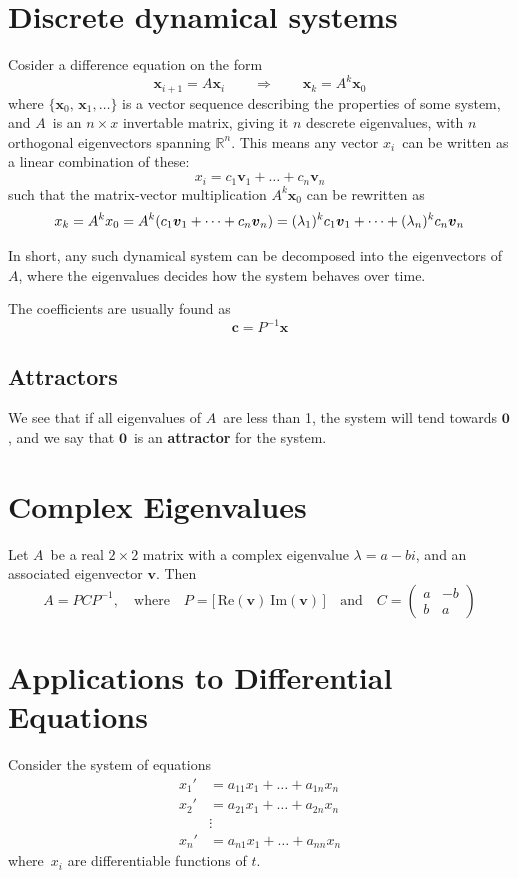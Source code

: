 \documentclass[12p,a4paper]{report}
\renewcommand{\b}{\boldsymbol}
\newcommand{\m}{\mathbb}
\begin{document}
\section{Discrete dynamical systems}
Cosider a difference equation on the form
\[
    \b x_{i+1} = A\b x_i \quad\quad \Rightarrow \quad\quad \b x_k = A^k \b x_0
\]
where $\{\b x_0,\,\b x_1,\dots\}$ is a vector sequence describing the properties of some system, and $A$ is an $n\times x$ invertable matrix, giving it $n$ descrete eigenvalues, with $n$ orthogonal eigenvectors spanning $\m R^n$. This means any vector $x_i$ can be written as a linear combination of these:
\[
    x_i = c_1 \b v_1 + \dots + c_n \b v_n
\]
such that the matrix-vector multiplication $A^k \b x_0$ can be rewritten as
\[
    x_k = A^k x_0 = A^k\qty(c_1 \b v_1 + \dots + c_n \b v_n) = (\lambda_1)^k c_1 \b v_1 + \dots + (\lambda_n)^k c_n \b v_n
\]

In short, any such dynamical system can be decomposed into the eigenvectors of $A$, where the eigenvalues decides how the system behaves over time.

The coefficients are usually found as
\[
    \b c = P^{-1}\b x
\]

\subsection{Attractors}
We see that if all eigenvalues of $A$ are less than 1, the system will tend towards $\b 0$, and we say that $\b 0$ is an \textbf{attractor} for the system.


\section{Complex Eigenvalues}
Let $A$ be a real $2\times 2$ matrix with a complex eigenvalue $\lambda = a-bi$, and an associated eigenvector $\b v$. Then
\[
    A = PCP^{-1}, \quad \text{where} \quad P = \big[\, \text{Re}(\b v) \ \text{Im}(\b v)\, \big] \quad \text{and} \quad C = \begin{pmatrix} a & -b \\ b & a \end{pmatrix}
\]


\section{Applications to Differential Equations}
Consider the system of equations
\begin{align*}
    x_1' &= a_{11}x_1 + \dots + a_{1n}x_n \\
    x_2' &= a_{21}x_1 + \dots + a_{2n}x_n \\
    &\vdots \\
    x_n' &= a_{n1}x_1 + \dots + a_{nn}x_n
\end{align*}
where $x_i$ are differentiable functions of $t$.
\end{document}
